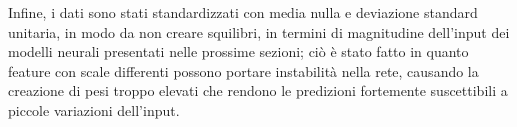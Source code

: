 Infine, i dati sono stati  standardizzati con media nulla e deviazione standard unitaria, in modo da non creare squilibri, in termini di magnitudine dell'input dei modelli neurali presentati nelle prossime sezioni; ciò è stato fatto in quanto feature con scale differenti possono portare instabilità nella rete, causando la creazione di pesi troppo elevati che rendono le predizioni fortemente suscettibili a piccole variazioni dell'input.